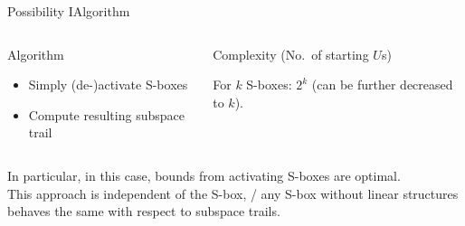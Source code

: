 \begin{frame}{Possibility I}{Algorithm}
    \begin{columns}[t,onlytextwidth]
        \begin{column}{0.5\textwidth}
            \begin{block}{Algorithm}
                \begin{minipage}[t][30pt][t]{\textwidth}
                \begin{itemize}
                    \item Simply (de-)activate S-boxes
                    \item Compute resulting subspace trail
                \end{itemize}
                \end{minipage}
            \end{block}
        \end{column}
        \begin{column}{0.4\textwidth}
            \begin{block}{Complexity (No.\ of starting $U$s)}
                \begin{minipage}[t][30pt][t]{\textwidth}
                \vspace*{0pt}
                For $k$ S-boxes: $2^k$ (can be further decreased to $k$).
                \end{minipage}
            \end{block}
        \end{column}
    \end{columns}
    \vspace{0.5em}
    In particular, in this case, bounds from activating S-boxes are optimal.\\[1em]
    This approach is independent of the S-box, \ie/ any S-box without linear structures behaves the same with respect to subspace trails.
\end{frame}


